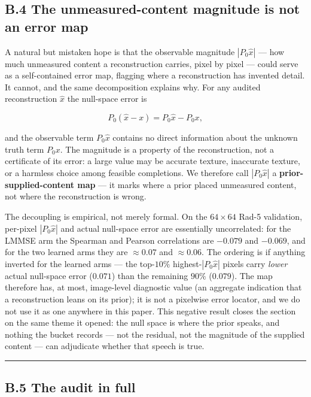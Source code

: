 \documentclass[11pt]{article}
\begin{document}
\subsection*{B.4 The unmeasured-content magnitude is not an error map}

A natural but mistaken hope is that the observable magnitude $|P_0 \hat{x}|$ --- how much unmeasured content a reconstruction carries, pixel by pixel --- could serve as a self-contained error map, flagging where a reconstruction has invented detail. It cannot, and the same decomposition explains why. For any audited reconstruction $\hat{x}$ the null-space error is

$$P_0(\hat{x} - x) = P_0 \hat{x} - P_0 x,$$

and the observable term $P_0 \hat{x}$ contains no direct information about the unknown truth term $P_0 x$. The magnitude is a property of the reconstruction, not a certificate of its error: a large value may be accurate texture, inaccurate texture, or a harmless choice among feasible completions. We therefore call $|P_0 \hat{x}|$ a \textbf{prior-supplied-content map} --- it marks where a prior placed unmeasured content, not where the reconstruction is wrong.

The decoupling is empirical, not merely formal. On the $64\times 64$ Rad-5 validation, per-pixel $|P_0 \hat{x}|$ and actual null-space error are essentially uncorrelated: for the LMMSE arm the Spearman and Pearson correlations are $-0.079$ and $-0.069$, and for the two learned arms they are $\approx 0.07$ and $\approx 0.06$. The ordering is if anything inverted for the learned arms --- the top-$10\%$ highest-$|P_0 \hat{x}|$ pixels carry \textit{lower} actual null-space error ($0.071$) than the remaining $90\%$ ($0.079$). The map therefore has, at most, image-level diagnostic value (an aggregate indication that a reconstruction leans on its prior); it is not a pixelwise error locator, and we do not use it as one anywhere in this paper. This negative result closes the section on the same theme it opened: the null space is where the prior speaks, and nothing the bucket records --- not the residual, not the magnitude of the supplied content --- can adjudicate whether that speech is true.

\medskip\hrule\medskip

\subsection*{B.5 The audit in full}
\end{document}

